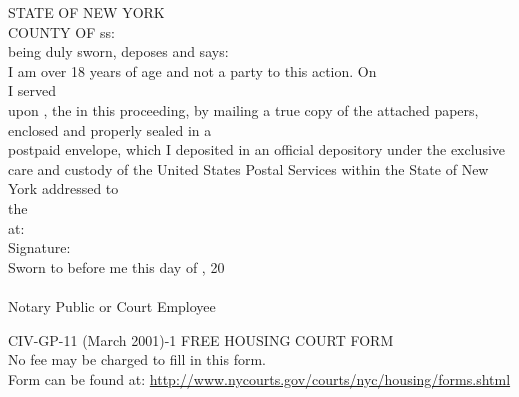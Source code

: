\documentclass[12pt]{article}
\begin{document}
\noindent
STATE OF NEW YORK \\
COUNTY OF \underline{\hspace{3cm}} ss: \\
\vspace{1em}
\noindent
\underline{\hspace{6cm}} being duly sworn, deposes and says: \\
\vspace{1em}
\noindent
I am over 18 years of age and not a party to this action. On \underline{\hspace{3cm}} \\
\vspace{1em}
\noindent
I served \underline{\hspace{6cm}} \\
\vspace{1em}
\noindent
upon \underline{\hspace{6cm}}, the \underline{\hspace{6cm}} in this proceeding, by mailing a true copy of the attached papers, enclosed and properly sealed in a \\
postpaid envelope, which I deposited in an official depository under the exclusive care and custody of the United States Postal Services within the State of New York addressed to \\
\vspace{1em}
\noindent
the \underline{\hspace{6cm}} \\
\vspace{1em}
\noindent
at: \underline{\hspace{6cm}} \\
\vspace{1em}
\noindent
Signature: \underline{\hspace{6cm}} \\
\vspace{1em}
\noindent
Sworn to before me this \underline{\hspace{1cm}} day of \underline{\hspace{3cm}}, 20\underline{\hspace{1cm}} \\
\vspace{1em}
\noindent
\underline{\hspace{6cm}} \\
Notary Public or Court Employee

\noindent
{} 

\vfill
\noindent
CIV-GP-11 (March 2001)-1 \hfill FREE HOUSING COURT FORM \\
\noindent
No fee may be charged to fill in this form. \\
Form can be found at: \url{http://www.nycourts.gov/courts/nyc/housing/forms.shtml}
\end{document}
